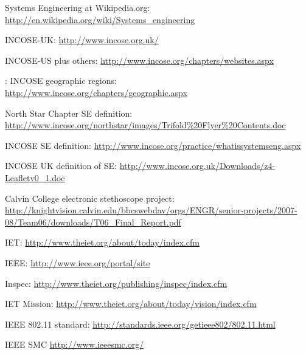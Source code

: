 \documentclass[a4paper,12pt]{article}
\begin{document}
\newpage
{}
\begin{thebibliography}{100}
	
 Systems Engineering at Wikipedia.org: \url{http://en.wikipedia.org/wiki/Systems_engineering}

 INCOSE-UK: \url{http://www.incose.org.uk/}

 INCOSE-US plus others: \url{http://www.incose.org/chapters/websites.aspx}

: INCOSE geographic regions:\\
\url{http://www.incose.org/chapters/geographic.aspx}

 North Star Chapter SE definition: \url{http://www.incose.org/northstar/images/Trifold%20Flyer%20Contents.doc}

 INCOSE SE definition: \url{http://www.incose.org/practice/whatissystemseng.aspx}

 INCOSE UK definition of SE: \url{http://www.incose.org.uk/Downloads/z4-Leafletv0_1.doc}

 Calvin College electronic stethoscope project: \url{http://knightvision.calvin.edu/bbcswebdav/orgs/ENGR/senior-projects/2007-08/Team06/downloads/T06_Final_Report.pdf}

 IET: \url{http://www.theiet.org/about/today/index.cfm}

 IEEE: \url{http://www.ieee.org/portal/site}

 Inspec: \url{http://www.theiet.org/publishing/inspec/index.cfm}

 IET Mission: \url{http://www.theiet.org/about/today/vision/index.cfm}

 IEEE 802.11 standard: \url{http://standards.ieee.org/getieee802/802.11.html}

 IEEE SMC \url{http://www.ieeesmc.org/}

\end{thebibliography}



\end{document}
